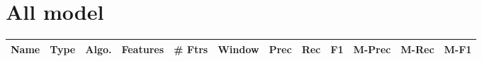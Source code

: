 \documentclass[a4paper]{article}
\begin{document}
\begin{landscape}
\begin{center}
\begin{tabular}{ |c|c|c|c|c|c|c|c|c|c|c|c|}
 	
 
 	
 
 	
 
 	
 
 	
 
 	
 
 	
 
 	
 
 	
 
 	
 
 	
 
 	
 
 	
 
 	
 
 	
 
 	
 
 	
 
 	
 
 	
 
 	
 
 	
 
 	
 
 	
 
 	
 
 	
 
 	
 
 	
 
 	
 
 	
 
 	
 
 	
 
 	
 
 	
 
 	
 
 	
 
 	
 
 	
 
 	
 
 	
 
 	
 
 	
 
 	
 
 	
 
 \hline
\end{tabular}
\end{center}



\section{All model }


\begin{center}
\begin{tabular}{ |c|c|c|c|c|c|c|c|c|c|c|c|} 
 \hline
 	Name & Type & Algo. & Features & \# Ftrs & Window & Prec & Rec & F1 & M-Prec & M-Rec & M-F1\\
 \hline
 

\end{tabular}
\end{center}
\end{landscape}
\end{document}
